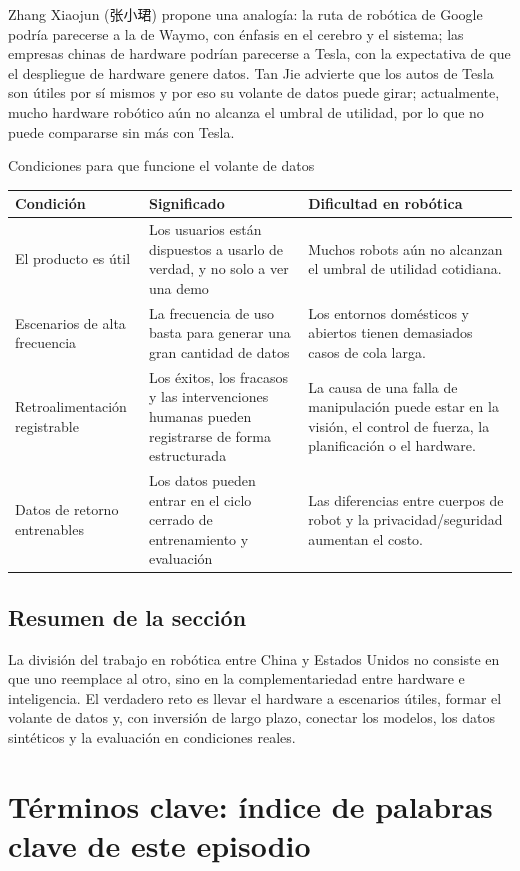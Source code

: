 \documentclass[a4paper]{article}
\begin{document}
Zhang Xiaojun (张小珺) propone una analogía: la ruta de robótica de Google podría parecerse a la de Waymo, con énfasis en el cerebro y el sistema; las empresas chinas de hardware podrían parecerse a Tesla, con la expectativa de que el despliegue de hardware genere datos. Tan Jie advierte que los autos de Tesla son útiles por sí mismos y por eso su volante de datos puede girar; actualmente, mucho hardware robótico aún no alcanza el umbral de utilidad, por lo que no puede compararse sin más con Tesla.

\begin{knowledgebox}{Condiciones para que funcione el volante de datos}
\begin{tabularx}{\textwidth}{p{}p{}X}
\toprule
Condición & Significado & Dificultad en robótica \\
\midrule
El producto es útil & Los usuarios están dispuestos a usarlo de verdad, y no solo a ver una demo & Muchos robots aún no alcanzan el umbral de utilidad cotidiana. \\
Escenarios de alta frecuencia & La frecuencia de uso basta para generar una gran cantidad de datos & Los entornos domésticos y abiertos tienen demasiados casos de cola larga. \\
Retroalimentación registrable & Los éxitos, los fracasos y las intervenciones humanas pueden registrarse de forma estructurada & La causa de una falla de manipulación puede estar en la visión, el control de fuerza, la planificación o el hardware. \\
Datos de retorno entrenables & Los datos pueden entrar en el ciclo cerrado de entrenamiento y evaluación & Las diferencias entre cuerpos de robot y la privacidad/seguridad aumentan el costo. \\
\bottomrule
\end{tabularx}
\end{knowledgebox}

\subsection{Resumen de la sección}

La división del trabajo en robótica entre China y Estados Unidos no consiste en que uno reemplace al otro, sino en la complementariedad entre hardware e inteligencia. El verdadero reto es llevar el hardware a escenarios útiles, formar el volante de datos y, con inversión de largo plazo, conectar los modelos, los datos sintéticos y la evaluación en condiciones reales.
\section{Términos clave: índice de palabras clave de este episodio}
\end{document}
